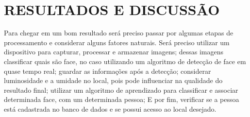 
\chapter{RESULTADOS E DISCUSSÃO}\label{cap:resultados}

Para chegar em um bom resultado será preciso passar por algumas etapas de 
processamento e considerar alguns fatores naturais. Será preciso utilizar 
um dispositivo para capturar, processar e armazenar imagens; dessas imagens 
classificar quais são face, no caso utilizando um algoritmo de detecção de 
face em quase tempo real; guardar as informações após a detecção; considerar 
luminosidade e a umidade no local, pois pode influenciar na qualidade do 
resultado final; utilizar um algoritmo de aprendizado para classificar e 
associar determinada face, com um determinada pessoa; E por fim, verificar 
se a pessoa está cadastrada no banco de dados e se possui acesso ao 
local desejado.